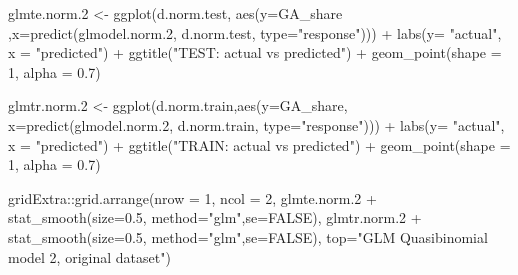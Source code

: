 \documentclass[
]{article}
\newenvironment{Shaded}{\begin{snugshade}}{\end{snugshade}}
\newcommand{\AttributeTok}[1]{\textcolor[rgb]{0.77,0.63,0.00}{#1}}
\newcommand{\ConstantTok}[1]{\textcolor[rgb]{0.00,0.00,0.00}{#1}}
\newcommand{\DecValTok}[1]{\textcolor[rgb]{0.00,0.00,0.81}{#1}}
\newcommand{\FloatTok}[1]{\textcolor[rgb]{0.00,0.00,0.81}{#1}}
\newcommand{\FunctionTok}[1]{\textcolor[rgb]{0.00,0.00,0.00}{#1}}
\newcommand{\NormalTok}[1]{#1}
\newcommand{\OtherTok}[1]{\textcolor[rgb]{0.56,0.35,0.01}{#1}}
\newcommand{\SpecialCharTok}[1]{\textcolor[rgb]{0.00,0.00,0.00}{#1}}
\newcommand{\StringTok}[1]{\textcolor[rgb]{0.31,0.60,0.02}{#1}}
\begin{document}
\begin{Shaded}
\begin{Highlighting}[]
\NormalTok{glmte.norm}\FloatTok{.2} \OtherTok{\textless{}{-}} \FunctionTok{ggplot}\NormalTok{(d.norm.test, }\FunctionTok{aes}\NormalTok{(}\AttributeTok{y=}\NormalTok{GA\_share ,}\AttributeTok{x=}\FunctionTok{predict}\NormalTok{(glmodel.norm}\FloatTok{.2}\NormalTok{, d.norm.test, }\AttributeTok{type=}\StringTok{"response"}\NormalTok{))) }\SpecialCharTok{+}
  \FunctionTok{labs}\NormalTok{(}\AttributeTok{y=} \StringTok{"actual"}\NormalTok{, }\AttributeTok{x =} \StringTok{"predicted"}\NormalTok{) }\SpecialCharTok{+} \FunctionTok{ggtitle}\NormalTok{(}\StringTok{"TEST: actual vs predicted"}\NormalTok{) }\SpecialCharTok{+} 
  \FunctionTok{geom\_point}\NormalTok{(}\AttributeTok{shape =} \DecValTok{1}\NormalTok{, }\AttributeTok{alpha =} \FloatTok{0.7}\NormalTok{)}

\NormalTok{glmtr.norm}\FloatTok{.2} \OtherTok{\textless{}{-}} \FunctionTok{ggplot}\NormalTok{(d.norm.train,}\FunctionTok{aes}\NormalTok{(}\AttributeTok{y=}\NormalTok{GA\_share, }\AttributeTok{x=}\FunctionTok{predict}\NormalTok{(glmodel.norm}\FloatTok{.2}\NormalTok{, d.norm.train, }\AttributeTok{type=}\StringTok{"response"}\NormalTok{))) }\SpecialCharTok{+}
  \FunctionTok{labs}\NormalTok{(}\AttributeTok{y=} \StringTok{"actual"}\NormalTok{, }\AttributeTok{x =} \StringTok{"predicted"}\NormalTok{) }\SpecialCharTok{+} \FunctionTok{ggtitle}\NormalTok{(}\StringTok{"TRAIN: actual vs predicted"}\NormalTok{) }\SpecialCharTok{+} 
  \FunctionTok{geom\_point}\NormalTok{(}\AttributeTok{shape =} \DecValTok{1}\NormalTok{, }\AttributeTok{alpha =} \FloatTok{0.7}\NormalTok{)}

\NormalTok{gridExtra}\SpecialCharTok{::}\FunctionTok{grid.arrange}\NormalTok{(}\AttributeTok{nrow =} \DecValTok{1}\NormalTok{, }\AttributeTok{ncol =} \DecValTok{2}\NormalTok{, }
\NormalTok{                        glmte.norm}\FloatTok{.2} \SpecialCharTok{+} \FunctionTok{stat\_smooth}\NormalTok{(}\AttributeTok{size=}\FloatTok{0.5}\NormalTok{, }\AttributeTok{method=}\StringTok{"glm"}\NormalTok{,}\AttributeTok{se=}\ConstantTok{FALSE}\NormalTok{),}
\NormalTok{                        glmtr.norm}\FloatTok{.2} \SpecialCharTok{+} \FunctionTok{stat\_smooth}\NormalTok{(}\AttributeTok{size=}\FloatTok{0.5}\NormalTok{, }\AttributeTok{method=}\StringTok{"glm"}\NormalTok{,}\AttributeTok{se=}\ConstantTok{FALSE}\NormalTok{),}
                        \AttributeTok{top=}\StringTok{"GLM Quasibinomial model 2, original dataset"}\NormalTok{)}
\end{Highlighting}
\end{Shaded}
\end{document}
